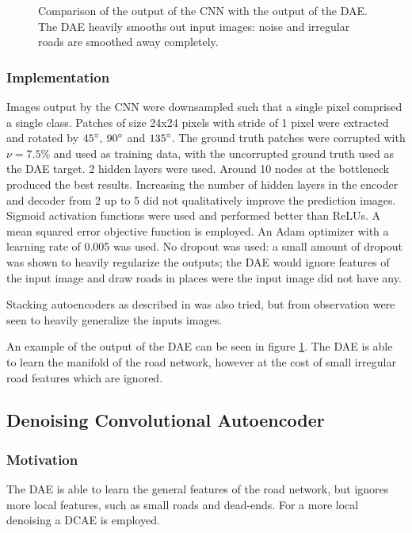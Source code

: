 \documentclass[10pt,conference,compsocconf]{IEEEtran}
\begin{document}
\begin{figure}[h!]
\caption{Comparison of the output of the CNN with the output of the DAE. The DAE heavily smooths out input images: noise and irregular roads are smoothed away completely.}
\label{fig:DAE}
\end{figure}

\subsubsection{Implementation}

Images output by the CNN were downsampled such that a single pixel comprised a single class. Patches of size 24x24 pixels with stride of 1 pixel were extracted and rotated by $45\degree$, $90\degree$ and $135\degree$. The ground truth patches were corrupted with $\nu=7.5\%$ and used as training data, with the uncorrupted ground truth used as the DAE target. 2 hidden layers were used. Around 10 nodes at the bottleneck produced the best results. Increasing the number of hidden layers in the encoder and decoder from 2 up to 5 did not qualitatively improve the prediction images. Sigmoid activation functions were used and performed better than ReLUs. A mean squared error objective function is employed. An Adam optimizer with a learning rate of 0.005 was used. No dropout was used: a small amount of dropout was shown to heavily regularize the outputs; the DAE would ignore features of the input image and draw roads in places were the input image did not have any.

Stacking autoencoders as described in \cite{VincentPASCALVINCENT2010} was also tried, but from observation were seen to heavily generalize the inputs images.

An example of the output of the DAE can be seen in figure \ref{fig:DAE}. The DAE is able to learn the manifold of the road network, however at the cost of small irregular road features which are ignored.

\subsection{Denoising Convolutional Autoencoder}
\label{CDAE}

\subsubsection{Motivation}

The DAE is able to learn the general features of the road network, but ignores more local features, such as small roads and dead-ends. For a more local denoising a DCAE is employed. 
\end{document}
